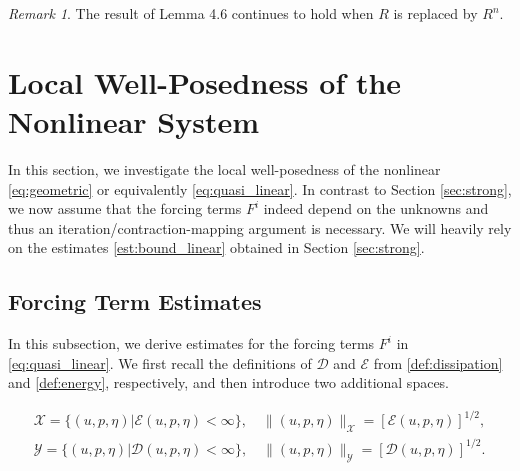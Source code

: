 \documentclass[letterpaper,reqno,10pt,twoside]{amsart}
\theoremstyle{definition}
\theoremstyle{remark}
\newtheorem{remark}{Remark}[section]
\begin{document}
	\begin{remark}
		The result of Lemma 4.6 continues to hold when $R$ is replaced by $R^{n}$.
	\end{remark}
	
	\section{Local Well-Posedness of the Nonlinear System}
	
	
	In this section, we investigate the local well-posedness of the nonlinear \eqref{eq:geometric} or equivalently \eqref{eq:quasi_linear}. In contrast to Section \ref{sec:strong}, we now assume that the forcing terms $F^i$ indeed depend on the unknowns and thus an iteration/contraction-mapping argument is necessary. We will heavily rely on the estimates \eqref{est:bound_linear} obtained in Section \ref{sec:strong}.
	
	
	\subsection{Forcing Term Estimates}\label{sec:nonlinear}
	
	
	In this subsection, we derive estimates for the forcing terms $F^i$ in \eqref{eq:quasi_linear}. We first recall the definitions of $\mathscr{D}$ and $\mathscr{E}$ from \eqref{def:dissipation} and \eqref{def:energy}, respectively, and then introduce two additional spaces.
	
	\begin{equation}\label{def:xy}
		\begin{aligned}
			\mathcal{X}=\Big\{(u,p,\eta)|\mathscr{E}(u,p,\eta)<\infty\Big\},\quad \|(u,p,\eta)\|_{\mathcal{X}}=\left[\mathscr{E}(u,p,\eta)\right]^{1/2},\\ \mathcal{Y}=\Big\{(u,p,\eta)|\mathscr{D}(u,p,\eta)<\infty\Big\}, \quad\|(u,p,\eta)\|_{\mathcal{Y}}=\left[\mathscr{D}(u,p,\eta)\right]^{1/2}.
		\end{aligned}
	\end{equation}
	
\end{document}
